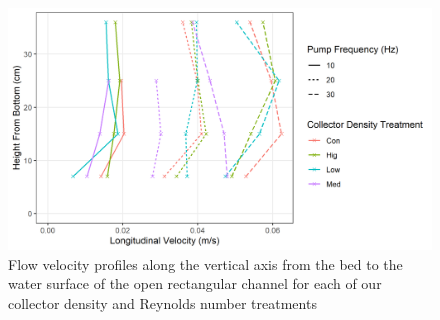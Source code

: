 \documentclass{scrreprt}
\newcommand\Rey{\mathrm{Re}}
\begin{document}
\begin{figure}[htbp]
\includegraphics[width=6in]{vectrino.png}
\centering
\caption{Flow velocity profiles along the vertical axis from the bed to the water surface of the open rectangular channel for each of our collector density and Reynolds number treatments}
\label{fig:vectrino}
\end{figure}



%
%



\end{document}
